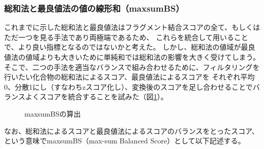 \subsubsection{総和法と最良値法の値の線形和（maxsumBS）}
これまでに示した総和法と最良値法はフラグメント結合スコアの全て、もしくはただ一つを見る手法であり両極端であるため、
これらを統合して用いることで、より良い指標となるのではないかと考えた。
しかし、総和法の値域が最良値法の値域よりも大きいために単純和では総和法の影響を大きく受けてしまう。
そこで、二つの手法を適当なバランスで組み合わせるために、フィルタリングを行いたい化合物の総和法によるスコア、最良値法によるスコアを
それぞれ平均0、分散1にし（すなわちzスコア化し）、変換後のスコアを足し合わせることでバランスよくスコアを統合することを試みた（図\ref{fig:maxsumBS}）。
\begin{figure}[htp]
 \begin{center}
  \caption{maxsumBSの算出}
  \label{fig:maxsumBS}
 \end{center}
\end{figure}
なお、総和法によるスコアと最良値法によるスコアのバランスをとったスコア、という意味でmaxsumBS（max-sum Balanced Score）として以下記述する。